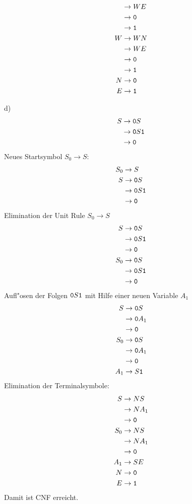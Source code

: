 {\begin{loesung}
\begin{teilaufgaben}
\begin{align*}
 &\rightarrow WE\\
 &\rightarrow {\tt 0}\\
 &\rightarrow {\tt 1}\\
W&\rightarrow WN\\
 &\rightarrow WE\\
 &\rightarrow {\tt 0}\\
 &\rightarrow {\tt 1}\\
N&\rightarrow {\tt 0}\\
E&\rightarrow {\tt 1}\\
\end{align*}
\item[d)]
\begin{align*}
S&\rightarrow {\tt 0}S\\
 &\rightarrow {\tt 0}S{\tt 1}\\
 &\rightarrow {\tt 0}
\end{align*}
Neues Startsymbol $S_0\to S$:
\begin{align*}
S_0&\rightarrow S\\
S&\rightarrow {\tt 0}S\\
 &\rightarrow {\tt 0}S{\tt 1}\\
 &\rightarrow {\tt 0}
\end{align*}
Elimination der Unit Rule $S_0\to S$
\begin{align*}
S&\rightarrow {\tt 0}S\\
 &\rightarrow {\tt 0}S{\tt 1}\\
 &\rightarrow {\tt 0}\\
S_0&\rightarrow {\tt 0}S\\
 &\rightarrow {\tt 0}S{\tt 1}\\
 &\rightarrow {\tt 0}
\end{align*}
Aufl"osen der Folgen ${\tt 0}S{\tt 1}$ mit Hilfe einer neuen Variable
$A_1$
\begin{align*}
S&\rightarrow {\tt 0}S\\
 &\rightarrow {\tt 0}A_1\\
 &\rightarrow {\tt 0}\\
S_0&\rightarrow {\tt 0}S\\
 &\rightarrow {\tt 0}A_1\\
 &\rightarrow {\tt 0}\\
A_1&\rightarrow S{\tt 1}
\end{align*}
Elimination der Terminalsymbole:
\begin{align*}
S&\rightarrow NS\\
 &\rightarrow NA_1\\
 &\rightarrow {\tt 0}\\
S_0&\rightarrow NS\\
 &\rightarrow NA_1\\
 &\rightarrow {\tt 0}\\
A_1&\rightarrow SE\\
N&\rightarrow {\tt 0}\\
E&\rightarrow {\tt 1}\\
\end{align*}
Damit ist CNF erreicht.
\end{teilaufgaben}
\end{loesung}
}{}

